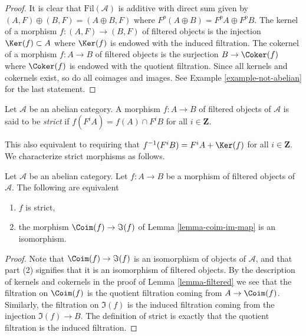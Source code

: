 \begin{proof}
It is clear that $\text{Fil}(\mathcal{A})$ is additive with direct
sum given by $(A, F) \oplus (B, F) = (A \oplus B, F)$ where
$F^p(A \oplus B) = F^pA \oplus F^pB$.
The kernel of a morphism $f : (A, F) \to (B, F)$ of filtered
objects is the injection $\Ker(f) \subset A$ where $\Ker(f)$
is endowed with the induced filtration.
The cokernel of a morphism $f : A \to B$ of filtered
objects is the surjection $B \to \Coker(f)$ where $\Coker(f)$
is endowed with the quotient filtration. Since all kernels and cokernels
exist, so do all coimages and images. See
Example \ref{example-not-abelian}
for the last statement.
\end{proof}

\begin{definition}
\label{definition-strict}
Let $\mathcal{A}$ be an abelian category.
A morphism $f : A \to B$ of filtered objects of $\mathcal{A}$ is
said to be {\it strict} if $f(F^iA) = f(A) \cap F^iB$ for
all $i \in \mathbf{Z}$.
\end{definition}

\noindent
This also equivalent to requiring that $f^{-1}(F^iB) = F^iA + \Ker(f)$
for all $i \in \mathbf{Z}$. We characterize strict morphisms
as follows.

\begin{lemma}
\label{lemma-characterize-strict-general}
Let $\mathcal{A}$ be an abelian category.
Let $f : A \to B$ be a morphism of filtered objects of $\mathcal{A}$.
The following are equivalent
\begin{enumerate}
\item $f$ is strict,
\item the morphism $\Coim(f) \to \Im(f)$ of
Lemma \ref{lemma-coim-im-map}
is an isomorphism.
\end{enumerate}
\end{lemma}

\begin{proof}
Note that $\Coim(f) \to \Im(f)$ is an isomorphism of
objects of $\mathcal{A}$, and that part (2) signifies that it is
an isomorphism of filtered objects.
By the description of kernels and cokernels in the proof of
Lemma \ref{lemma-filtered}
we see that the filtration on $\Coim(f)$ is the
quotient filtration coming from $A \to \Coim(f)$.
Similarly, the filtration on $\Im(f)$ is the induced
filtration coming from the injection $\Im(f) \to B$.
The definition of strict is exactly that the quotient filtration
is the induced filtration.
\end{proof}

